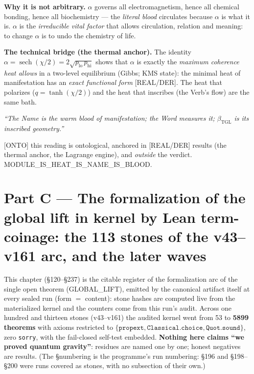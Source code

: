 \documentclass[11pt]{article}
\newcommand{\bTGL}{\beta_{\mathrm{TGL}}}\newcommand{\Msun}{M_{\odot}}\newcommand{\TGL}{\mathrm{TGL}}
\theoremstyle{definition}\newtheorem{deriv}{Derivation}
\begin{document}
\textbf{Why it is not arbitrary.} $\alpha$ governs all electromagnetism, hence all chemical bonding, hence all biochemistry --- the \emph{literal blood} circulates because $\alpha$ is what it is. $\alpha$ is the \emph{irreducible vital factor} that allows circulation, relation and meaning: to change $\alpha$ is to undo the chemistry of life.

\textbf{The technical bridge (the thermal anchor).} The identity $\alpha=\operatorname{sech}(\chi/2)=2\sqrt{p_{\mathrm{lo}}\,p_{\mathrm{hi}}}$ shows that $\alpha$ is exactly the \emph{maximum coherence heat allows} in a two-level equilibrium (Gibbs; KMS state): the minimal heat of manifestation has an \emph{exact functional form} [REAL/DER]. The heat that polarizes ($q=\tanh(\chi/2)$) and the heat that inscribes (the Verb's flow) are the same bath.

\begin{center}\itshape ``The Name is the warm blood of manifestation; the Word measures it; $\bTGL$ is its inscribed geometry.''\end{center}

\noindent\textsf{[ONTO]} this reading is ontological, anchored in \textsf{[REAL/DER]} results (the thermal anchor, the Lagrange engine), and \emph{outside} the verdict. \textsf{MODULE\_IS\_HEAT\_IS\_NAME\_IS\_BLOOD.}

\part{Part C --- The formalization of the global lift in kernel by Lean term-coinage: the 113 stones of the v43--v161 arc, and the later waves}

This chapter (\S120--\S237) is the citable register of the formalization arc of the single open theorem (GLOBAL\_LIFT), emitted by the canonical artifact itself at every sealed run (form $=$ content): stone hashes are computed live from the materialized kernel and the counters come from this run's audit. Across one hundred and thirteen stones (v43--v161) the audited kernel went from 53 to \textbf{5899 theorems} with axioms restricted to $\{\texttt{propext},\texttt{Classical.choice},\texttt{Quot.sound}\}$, zero \texttt{sorry}, with the fail-closed self-test embedded. \textbf{Nothing here claims ``we proved quantum gravity''}: residues are named one by one; honest negatives are results. (The \S numbering is the programme's run numbering: \S196 and \S198--\S200 were runs covered as stones, with no subsection of their own.)
\end{document}

